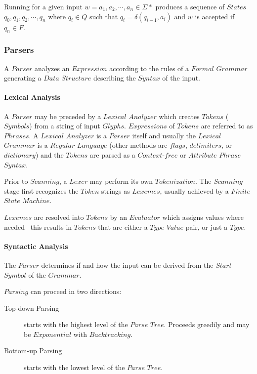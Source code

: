 \documentclass{article}
\begin{document}
    Running for a given input $w = a_1,a_2, \cdots , a_n \in \Sigma*$
    produces a sequence of $States$ $q_0,q_1,q_2,\cdots , q_n$ where
    $q_i \in Q$ such that $q_i = \delta (q_{i-1},a_i)$ and $w$ is
    accepted if $q_n \in F$.

\subsubsection{Parsers}

    A $Parser$ analyzes an $Expression$ according to the rules of a
    $Formal$ $Grammar$ generating a $Data$ $Structure$ describing the
    $Syntax$ of the input.

    \paragraph{Lexical Analysis}
    A $Parser$ may be preceded by a $Lexical$ $Analyzer$ which creates
    $Tokens$ ($Symbols$) from a string of input
    $Glyphs$. $Expressions$ of $Tokens$ are referred to as
    $Phrases$. A $Lexical$ $Analyzer$ is a $Parser$ itself and usually
    the $Lexical$ $Grammar$ is a $Regular$ $Language$ (other methods
    are $flags$, $delimiters$, or $dictionary$) and the $Tokens$ are
    parsed as a $Context$-$free$ or $Attribute$ $Phrase$ $Syntax$.

    Prior to $Scanning$, a $Lexer$ may perform its own $Tokenization$.
    The $Scanning$ stage first recognizes the $Token$ strings as
    $Lexemes$, usually achieved by a $Finite$ $State$ $Machine$.

    $Lexemes$ are resolved into $Tokens$ by an $Evaluator$ which
    assigns values where needed-- this results in $Tokens$ that are
    either a $Type$-$Value$ pair, or just a $Type$.

    \paragraph{Syntactic Analysis}

    The $Parser$ determines if and how the input can be derived from
    the $Start$ $Symbol$ of the $Grammar$.

    $Parsing$ can proceed in two directions:

    \begin{description}
    \item[Top-down Parsing]
    starts with the highest level of the $Parse$ $Tree$. Proceeds
    greedily and may be $Exponential$ with $Backtracking$.
    \item[Bottom-up Parsing]
    starts with the lowest level of the $Parse$ $Tree$.
    \end{description}
\end{document}
